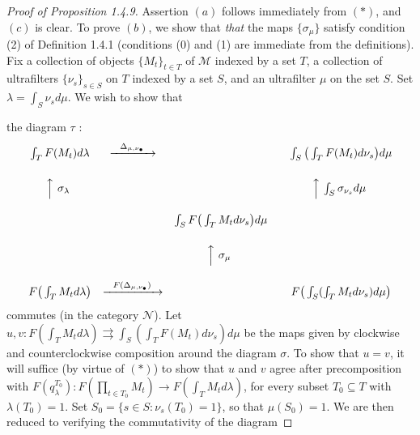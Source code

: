 \documentclass[11pt]{article}
\theoremstyle{plain}
\begin{document}
\begin{proof}[Proof of Proposition 1.4.9]
Assertion $(a)$ follows immediately from $(\ast)$, and $(c)$ is clear. To prove $(b)$, we show that
\emph{that} the maps $\{\sigma_\mu\}$ satisfy condition (2) of Definition 1.4.1 (conditions (0) and (1) are
immediate from the definitions). Fix a collection of objects $\{M_t\}_{t \in T}$ of $\mathcal{M}$ indexed by a
set $T$, a collection of ultrafilters $\{\nu_s\}_{s \in S}$ on $T$ indexed by a set $S$, and an ultrafilter
$\mu$ on the set $S$. Set $\lambda = \int_S \nu_s d\mu$. We wish to show that



the diagram $\tau$ :
\[
\begin{array}{ccccc}
\int_T F(M_t)d\lambda & \xrightarrow{\ \ \Delta_{\mu,\nu_\bullet}\ \ } & & & \int_S\big(\int_T F(M_t)d\nu_s\big)d\mu\\[16pt]
\Big\uparrow{\ \sigma_\lambda\ } & & & & \Big\uparrow{\ \int_S \sigma_{\nu_s}d\mu\ }\\[16pt]
& & \int_S F\big(\int_T M_t d\nu_s\big)d\mu & & \\[16pt]
& & \Big\uparrow{\ \sigma_\mu\ } & & \\[16pt]
F\big(\int_T M_t d\lambda\big) & \xrightarrow{\ \ F(\Delta_{\mu,\nu_\bullet})\ \ } & & & F\big(\int_S(\int_T M_t d\nu_s)d\mu\big)
\end{array}
\]
commutes (in the category $\mathcal{N}$). Let $u, v : F(\int_T M_t d\lambda) \rightrightarrows
\int_S(\int_T F(M_t)d\nu_s)d\mu$ be the maps given by clockwise and counterclockwise composition around the
diagram \emph{$\sigma$}. To show that $u = v$, it will suffice (by virtue of $(\ast)$) to show that $u$ and
$v$ agree after precomposition with $F(q_\lambda^{T_0}) : F(\prod_{t \in T_0} M_t) \to F(\int_T M_t d\lambda)$,
for every subset $T_0 \subseteq T$ with $\lambda(T_0) = 1$. Set $S_0 = \{s \in S : \nu_s(T_0) = 1\}$, so that
$\mu(S_0) = 1$. We are then reduced to verifying the commutativity of the diagram


\end{proof}
\end{document}
